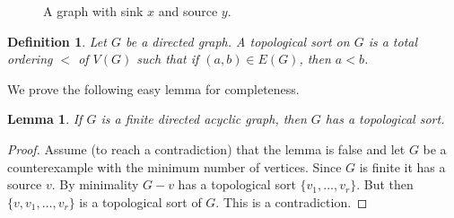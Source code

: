 \documentclass[12pt]{article}
\newtheorem{lem}[thm]{Lemma}
\newtheorem{defn}{Definition}
\theoremstyle{remark}
\begin{document}
\begin{figure}[h]
\centering
{}
\caption{A graph with sink $x$ and source $y$.}
\end{figure}

\begin{defn}
Let $G$ be a directed graph.  A \emph{topological sort} on $G$ is a total ordering $<$ of $V(G)$ such that if $(a,b) \in E(G)$, then $a < b$.
\end{defn}

We prove the following easy lemma for completeness.
\begin{lem}
If $G$ is a finite directed acyclic graph, then $G$ has a topological sort.
\end{lem}
\begin{proof}
Assume (to reach a contradiction) that the lemma is false and let $G$ be a counterexample with the minimum number of vertices.  Since $G$ is finite it has a source $v$.  By minimality $G - v$ has a topological sort $\{v_1, \ldots, v_r\}$.  But then $\{v, v_1, \ldots, v_r\}$ is a topological sort of $G$. This is a contradiction.
\end{proof}
\end{document}
